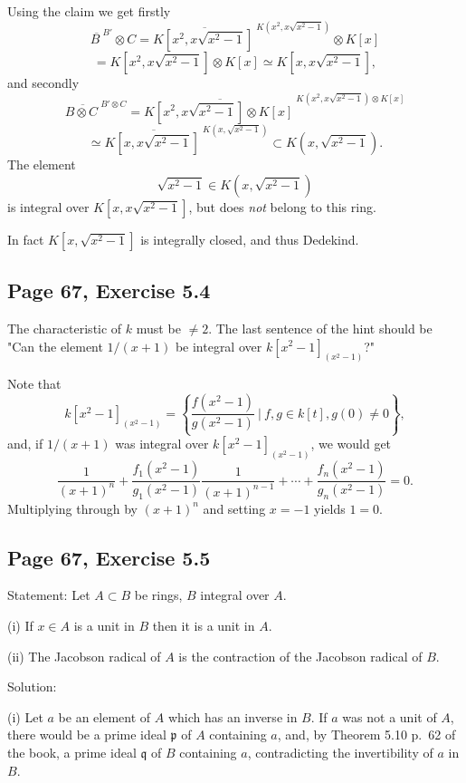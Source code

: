 \documentclass[parskip=half,fontsize=12pt]{scrartcl}%
\newcommand{\mf}{\mathfrak}
\newcommand{\mmm}{\mf m}
\newcommand{\ppp}{\mf p}
\newcommand{\qqq}{\mf q}
\begin{document}
Using the claim we get firstly
$$
\overline{B\ }^{B'}\otimes C=\overline{K\left[x^2,x\sqrt{x^2-1}\right]\ }^{K\left(x^2,x\sqrt{x^2-1}\right)}\otimes K[x]
$$
$$
=K\left[x^2,x\sqrt{x^2-1}\right]\otimes K[x]\simeq K\left[x,x\sqrt{x^2-1}\right],
$$ 
and secondly 
$$ 
\overline{B\otimes C\ }^{B'\otimes C}=\overline{K\left[x^2,x\sqrt{x^2-1}\right]\otimes K[x]\ }^{K\left(x^2,x\sqrt{x^2-1}\right)\otimes K[x]}
$$
$$
\simeq\overline{K\left[x,x\sqrt{x^2-1}\right]\ }^{K\left(x,\sqrt{x^2-1}\right)}\subset K\left(x,\sqrt{x^2-1}\right).
$$ 
The element 
$$
\sqrt{x^2-1}\in K\left(x,\sqrt{x^2-1}\right)
$$ 
is integral over $K\left[x,x\sqrt{x^2-1}\right]$, but does \emph{not} belong to this ring.

In fact $K\left[x,\sqrt{x^2-1}\right]$ is integrally closed, and thus Dedekind.


\subsection{Page 67, Exercise 5.4}%

The characteristic of $k$ must be $\ne2$. The last sentence of the hint should be "Can the element $1/(x + 1)$ be integral over $k[x^2-1]_{(x^2-1)}$?" 

Note that 
$$
k[x^2-1]_{(x^2-1)}=\left\{\frac{f(x^2-1)}{g(x^2-1)}\ \bigg|\ f,g\in k[t],g(0)\ne0\right\},
$$ 
and, if $1/(x + 1)$ was integral over $k[x^2-1]_{(x^2-1)}$, we would get 
$$
\frac1{(x+1)^n}+\frac{f_1(x^2-1)}{g_1(x^2-1)}\frac1{(x+1)^{n-1}}+\cdots+\frac{f_n(x^2-1)}{g_n(x^2-1)}=0.
$$ 
Multiplying through by $(x+1)^n$ and setting $x=-1$ yields $1=0$. 

\subsection{Page 67, Exercise 5.5}\label{55}%

Statement: Let $A\subset B$ be rings, $B$ integral over $A$.

(i) If $x\in A$ is a unit in $B$ then it is a unit in $A$.

(ii) The Jacobson radical of $A$ is the contraction of the Jacobson radical of $B$. 

Solution: 

(i) Let $a$ be an element of $A$ which has an inverse in $B$. If $a$ was not a unit of $A$, there would be a prime ideal $\ppp$ %
of $A$ containing $a$, and, by Theorem 5.10 p.~62 of the book, a prime ideal $\qqq$ of $B$ containing $a$, %
contradicting the invertibility of $a$ in $B$. 
\end{document}
